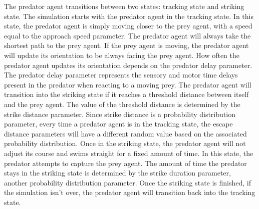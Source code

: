 \documentclass[]{rsos}%
\begin{document}
The predator agent transitions between two states: tracking state and striking state. The simulation starts with the predator agent in the tracking state. In this state, the predator agent is simply moving closer to the prey agent, with a speed equal to the approach speed parameter. The predator agent will always take the shortest path to the prey agent. If the prey agent is moving, the predator agent will update its orientation to be always facing the prey agent. How often the predator agent updates its orientation depends on the predator delay parameter. The predator delay parameter represents the sensory and motor time delays present in the predator when reacting to a moving prey. The predator agent will transition into the striking state if it reaches a threshold distance between itself and the prey agent. The value of the threshold distance is determined by the strike distance parameter. Since strike distance is a probability distribution parameter, every time a predator agent is in the tracking state, the escape distance parameters will have a different random value based on the associated probability distribution. Once in the striking state, the predator agent will not adjust its course and swims straight for a fixed amount of time. In this state, the predator attempts to capture the prey agent. The amount of time the predator stays in the striking state is determined by the strike duration parameter, another probability distribution parameter. Once the striking state is finished, if the simulation isn’t over, the predator agent will transition back into the tracking state.
\end{document}
